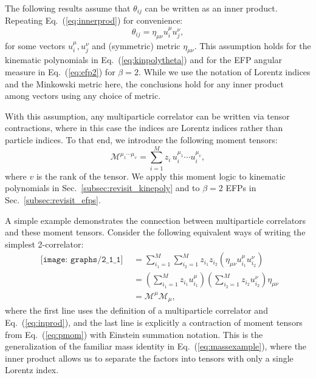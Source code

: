 \documentclass[aps,prd,floatfix,preprintnumbers,twocolumn,groupedaddress,nofootinbib,longbibliography,10pt]{revtex4-1}
\DeclareRobustCommand{\Sec}[1]{Sec.~\ref{#1}}
\DeclareRobustCommand{\Eq}[1]{Eq.~(\ref{#1})}
\begin{document}
The following results assume that $\theta_{ij}$ can be written as an inner product.
%
Repeating \Eq{eq:innerprod} for convenience:
%
\begin{equation}
\label{eq:inprod}
\theta_{ij} = \eta_{\mu\nu} u_i^\mu u_{j}^\nu,
\end{equation}
%
for some vectors $u_i^\mu,u_j^\nu$ and (symmetric) metric $\eta_{\mu\nu}$.
%
This assumption holds for the kinematic polynomials in \Eq{eq:kinpolytheta} and for the EFP angular measure in \Eq{eq:efp2} for $\beta=2$.
%
While we use the notation of Lorentz indices and the Minkowski metric here, the conclusions hold for any inner product among vectors using any choice of metric.


With this assumption, any multiparticle correlator can be written via tensor contractions, where in this case the indices are Lorentz indices rather than particle indices.
%
To that end, we introduce the following moment tensors:
%
\begin{equation}
\label{eq:pmom}
\mathcal M^{\mu_1\cdots \mu_v} = \sum_{i=1}^M z_i \, u_i^{\mu_1} \cdots u_i^{\mu_v},
\end{equation}
%
where $v$ is the rank of the tensor.
%
We apply this moment logic to kinematic polynomials in \Sec{subsec:revisit_kinepoly} and to $\beta = 2$ EFPs in \Sec{subsec:revisit_efps}.


A simple example demonstrates the connection between multiparticle correlators and these moment tensors.
%
Consider the following equivalent ways of writing the simplest 2-correlator:
\begin{align}
\begin{gathered}\texttt{[image: graphs/2\_1\_1]}\end{gathered} & = \sum_{i_1=1}^M \sum_{i_2=1}^M z_{i_1} z_{i_2} (\eta_{\mu\nu}u_{i_1}^\mu  u_{i_2}^\nu)
\label{eq:mass2}
\\&=\left(\sum_{i_1=1}^Mz_{i_1} u_{i_1}^{\mu}\right)\left(\sum_{i_2=1}^Mz_{i_2} u_{i_2}^{\nu}\right)\eta_{\mu\nu}
\nonumber %
\\&= \mathcal M^\mu\mathcal M_\mu, \nonumber
\end{align}
where the first line uses the definition of a multiparticle correlator and \Eq{eq:inprod}, and the last line is explicitly a contraction of moment tensors from \Eq{eq:pmom} with Einstein summation notation.
%
This is the generalization of the familiar mass identity in \Eq{eq:massexample}, where the inner product allows us to separate the factors into tensors with only a single Lorentz index.
\end{document}
